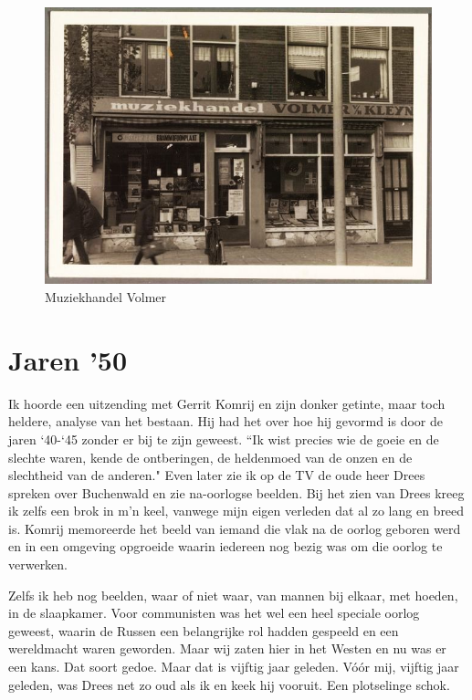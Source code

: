 \documentclass[10pt,twoside, openright]{memoir}
\begin{document}
\begin{figure}
\includegraphics[width=\textwidth]{img/97volmer}
\caption*{\footnotesize Muziekhandel Volmer}
\end{figure}


\chapter{Jaren '50} %
\label{cha:jaren50}

Ik hoorde een uitzending met Gerrit Komrij en zijn donker getinte, maar toch heldere, analyse van het bestaan. Hij had het over hoe hij gevormd is door de jaren `40-`45 zonder er bij te zijn geweest. ``Ik wist precies wie de goeie en de slechte waren, kende de ontberingen, de heldenmoed van de onzen en de slechtheid van de anderen." Even later zie ik op de TV de oude heer Drees spreken over Buchenwald en zie na-oorlogse beelden. Bij het zien van Drees kreeg ik zelfs een brok in m’n keel, vanwege mijn eigen verleden dat al zo lang en breed is. Komrij memoreerde het beeld van iemand die vlak na de oorlog geboren werd en in een omgeving opgroeide waarin iedereen nog bezig was om die oorlog te verwerken. 

Zelfs ik heb nog beelden, waar of niet waar, van mannen bij elkaar, met hoeden, in de slaapkamer. Voor communisten was het wel een heel speciale oorlog geweest, waarin de Russen een belangrijke rol hadden gespeeld en een wereldmacht waren geworden. Maar wij zaten hier in het Westen en nu was er een kans. Dat soort gedoe. Maar dat is vijftig jaar geleden. Vóór mij, vijftig jaar geleden, was Drees net zo oud als ik en keek hij vooruit. Een plotselinge schok.
\end{document}
